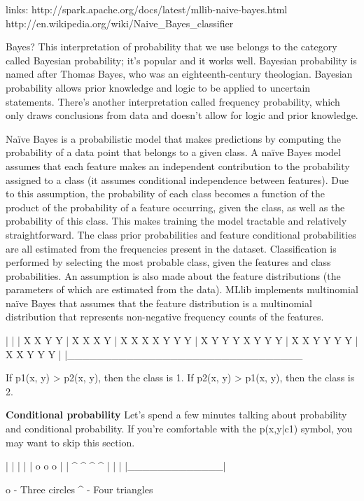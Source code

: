 links:
http://spark.apache.org/docs/latest/mllib-naive-bayes.html
http://en.wikipedia.org/wiki/Naive_Bayes_classifier

Bayes?
This interpretation of probability that we use belongs to the category called Bayesian
probability; it’s popular and it works well. Bayesian probability is named after Thomas
Bayes, who was an eighteenth-century theologian. Bayesian probability allows prior
knowledge and logic to be applied to uncertain statements. There’s another
interpretation called frequency probability, which only draws conclusions from data
and doesn’t allow for logic and prior knowledge.


Naïve Bayes is a probabilistic model that makes predictions by computing the
probability of a data point that belongs to a given class. A naïve Bayes model
assumes that each feature makes an independent contribution to the probability
assigned to a class (it assumes conditional independence between features).
Due to this assumption, the probability of each class becomes a function of the
product of the probability of a feature occurring, given the class, as well as the
probability of this class. This makes training the model tractable and relatively
straightforward. The class prior probabilities and feature conditional probabilities are
all estimated from the frequencies present in the dataset. Classification is performed
by selecting the most probable class, given the features and class probabilities.
An assumption is also made about the feature distributions (the parameters of
which are estimated from the data). MLlib implements multinomial naïve Bayes that
assumes that the feature distribution is a multinomial distribution that represents
non-negative frequency counts of the features.


|
|
|     X X      Y Y
|    X X X      Y
|   X  X X X     Y Y Y
|     X      Y Y Y X Y Y Y
|   X X       Y  Y  Y  Y
|  X X       Y Y Y
|
|________________________________


If p1(x, y) > p2(x, y), then the class is 1.
If p2(x, y) > p1(x, y), then the class is 2.



\textbf{Conditional probability}
Let’s spend a few minutes talking about probability and conditional probability. If
you’re comfortable with the p(x,y|c1) symbol, you may want to skip this section.

|             |
|             |
| o o o       |
| ^ ^ ^ ^     |
|             |
|_____________|

o - Three circles
^ - Four triangles

